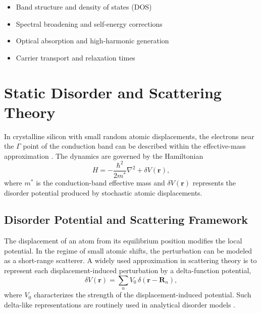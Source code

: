 \begin{itemize}
    \item Band structure and density of states (DOS)
    \item Spectral broadening and self-energy corrections
    \item Optical absorption and high-harmonic generation
    \item Carrier transport and relaxation times
\end{itemize}








\section{Static Disorder and Scattering Theory}
\label{sec:RandomSi}

In crystalline silicon with small random atomic displacements, the electrons near the $\Gamma$ point of the conduction band can be described within the effective-mass approximation \cite{Kittel2005,YuCardona2010}. The dynamics are governed by the Hamiltonian
\begin{equation}
H = -\frac{\hbar^2}{2 m^\ast} \nabla^2 + \delta V(\mathbf{r}),
\end{equation}
where $m^\ast$ is the conduction-band effective mass and $\delta V(\mathbf{r})$ represents the disorder potential produced by stochastic atomic displacements.

\subsection{Disorder Potential and Scattering Framework}

The displacement of an atom from its equilibrium position modifies the local potential. In the regime of small atomic shifts, the perturbation can be modeled as a short-range scatterer. A widely used approximation in scattering theory \cite{Mahan2000,Economou2006} is to represent each displacement-induced perturbation by a delta-function potential,
\begin{equation}
\delta V(\mathbf{r}) = \sum_{n} V_0 \, \delta(\mathbf{r} - \mathbf{R}_n),
\end{equation}
where $V_0$ characterizes the strength of the displacement-induced potential.  
Such delta-like representations are routinely used in analytical disorder models \cite{Schirmacher2009,Paul1Ddisorder2017}.

